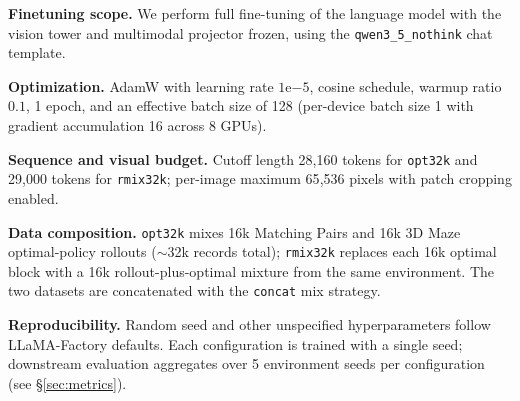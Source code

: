 \noindent\textbf{Finetuning scope.} We perform full fine-tuning of the language model with the vision tower and multimodal projector frozen, using the \texttt{qwen3\_5\_nothink} chat template.

\noindent\textbf{Optimization.} AdamW with learning rate $1\mathrm{e}{-5}$, cosine schedule, warmup ratio $0.1$, 1 epoch, and an effective batch size of 128 (per-device batch size 1 with gradient accumulation 16 across 8 GPUs).

\noindent\textbf{Sequence and visual budget.} Cutoff length 28{,}160 tokens for \texttt{opt32k} and 29{,}000 tokens for \texttt{rmix32k}; per-image maximum 65{,}536 pixels with patch cropping enabled.

\noindent\textbf{Data composition.} \texttt{opt32k} mixes 16k Matching Pairs and 16k 3D Maze optimal-policy rollouts ($\sim$32k records total); \texttt{rmix32k} replaces each 16k optimal block with a 16k rollout-plus-optimal mixture from the same environment. The two datasets are concatenated with the \texttt{concat} mix strategy.

\noindent\textbf{Reproducibility.} Random seed and other unspecified hyperparameters follow LLaMA-Factory defaults. Each configuration is trained with a single seed; downstream evaluation aggregates over 5 environment seeds per configuration (see §\ref{sec:metrics}).
